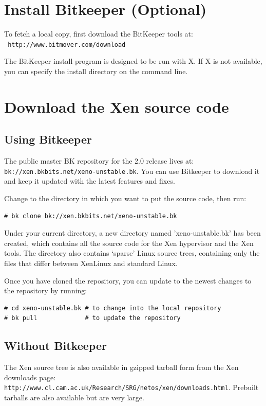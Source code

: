 \documentclass[11pt,twoside,final,openright]{xenstyle}
\begin{document}
\section{Install Bitkeeper (Optional)}

To fetch a local copy, first download the BitKeeper tools at: \\ {\tt
http://www.bitmover.com/download }

The BitKeeper install program is designed to be run with X.  If X is
not available, you can specify the install directory on the command
line.

\section{Download the Xen source code}

\subsection{Using Bitkeeper}

The public master BK repository for the 2.0 release lives at: \\
{\tt bk://xen.bkbits.net/xeno-unstable.bk}.  You can use Bitkeeper to
download it and keep it updated with the latest features and fixes.

Change to the directory in which you want to put the source code, then
run:
\begin{verbatim}
# bk clone bk://xen.bkbits.net/xeno-unstable.bk
\end{verbatim}

Under your current directory, a new directory named 'xeno-unstable.bk'
has been created, which contains all the source code for the Xen
hypervisor and the Xen tools.  The directory also contains `sparse'
Linux source trees, containing only the files that differ between
XenLinux and standard Linux.

Once you have cloned the repository, you can update to the newest
changes to the repository by running:
\begin{verbatim}
# cd xeno-unstable.bk # to change into the local repository
# bk pull             # to update the repository
\end{verbatim}

\subsection{Without Bitkeeper}

The Xen source tree is also available in gzipped tarball form from the
Xen downloads page:\\
{\tt http://www.cl.cam.ac.uk/Research/SRG/netos/xen/downloads.html}.
Prebuilt tarballs are also available but are very large.
\end{document}
